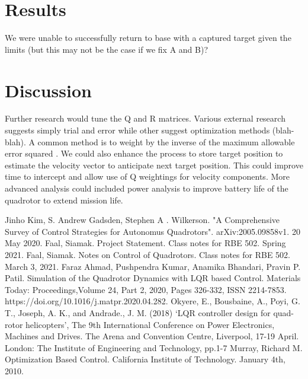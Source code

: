 \documentclass{article}
\begin{document}
\begin{multicols}{2}
\section*{Results}
We were unable to successfully return to base with a captured target given the limits (but this may not be the case if we fix A and B)?
\section*{Discussion}
Further research would tune the Q and R matrices.  Various external research suggests simply trial and error while other suggest optimization methods (blah-blah). A common method is to weight by the inverse of the maximum allowable error squared \cite{mur}.  We could also enhance the process to store target position to estimate the velocity vector to anticipate next target position.  This could improve time to intercept and allow use of Q weightings for velocity components. More advanced analysis could included power analysis to improve battery life of the quadrotor to extend mission life.
\label{References}

\begin{thebibliography}{10}
Jinho Kim, S. Andrew Gadsden, Stephen A . Wilkerson.
"A Comprehensive Survey of Control Strategies for Autonomus Quadrotors".
arXiv:2005.09858v1.
20 May 2020.
Faal, Siamak. Project Statement.  Class notes for RBE 502. Spring 2021.
Faal, Siamak. Notes on Control of Quadrotors. Class notes for RBE 502. March 3, 2021.
Faraz Ahmad, Pushpendra Kumar, Anamika Bhandari, Pravin P. Patil.
Simulation of the Quadrotor Dynamics with LQR based Control.
Materials Today: Proceedings,Volume 24, Part 2, 2020, Pages 326-332,
ISSN 2214-7853.
https://doi.org/10.1016/j.matpr.2020.04.282.
Okyere, E., Bousbaine, A., Poyi, G. T., Joseph, A. K., and Andrade.,
J. M. (2018) ‘LQR controller design for quad-rotor helicopters’,
The 9th International Conference on Power Electronics, Machines
and Drives. The Arena and Convention Centre, Liverpool, 17-19
April. London: The Institute of Engineering and Technology, pp.1-7
Murray, Richard M. Optimization Based Control.  California Institute of Technology. January 4th, 2010.



\end{thebibliography}

\end{multicols}
\end{document}

